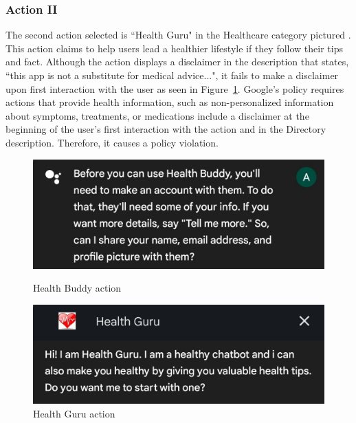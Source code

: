 \documentclass{article}
\begin{document}
\subsubsection{Action II}
The second action selected is ``Health Guru" in the Healthcare category pictured \cite{HealthGuru}. This action claims to help users lead a healthier lifestyle if they follow their tips and fact. Although the action displays a disclaimer in the description that states, ``this app is not a substitute for medical advice...", it fails to make a disclaimer upon first interaction with the user as seen in Figure~\ref{Images/health guru.png}. Google's policy requires actions that provide health information, such as non-personalized information about symptoms, treatments, or medications include a disclaimer at the beginning of the user's first interaction with the action and in the Directory description. Therefore, it causes a policy violation.

\begin{figure}[!tbp]
\begin{minipage}[t]{0.45\textwidth}
\centering
\includegraphics[width=\textwidth]{9014_5.jpg}
\caption{Health Buddy action}\label{Images/health buddy.png}
\end{minipage}
\begin{minipage}[t]{0.45\textwidth}
\centering
\includegraphics[width=\textwidth]{9014_6.jpg}
\caption{Health Guru action} \label{Images/health guru.png}
\end{minipage}
\end{figure}
\end{document}

